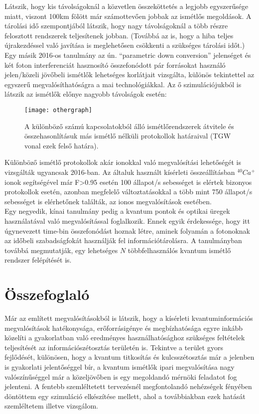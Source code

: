Látszik, hogy kis távolságoknál a közvetlen összeköttetés a legjobb egyszerűsége miatt, viszont 100km fölött már számottevően jobbak az ismétlős megoldások. A tárolási idő szempontjából látszik, hogy nagy távolságoknál a több részre felosztott rendszerek teljesítenek jobban. (Továbbá az is, hogy a hiba teljes újrakezdéssel való javítása is meglehetősen csökkenti a szükséges tárolási időt.)\\
Egy másik 2016-os tanulmány \cite{krovi2016practical} az ún. ``parametric down conversion'' jelenséget és két foton interferenciát hasznosító  összefonódott pár forrásokat használó jelen/közeli jövőbeli ismétlők lehetséges korlátjait vizsgálta, különös tekintettel az egyszerű megvalósíthatóságra a mai technológiákkal. Az ő szimulációjukból is látszik az ismétlők előnye nagyobb távolságok esetén:\\
\begin{figure}[H]
\centering
\texttt{[image: othergraph]}
\caption[Ismétlő teljesítményhatár]{A különböző számú kapcsolatokból álló ismétlőrendszerek átvitele és összehasonlításuk más ismétlő nélküli protokollok határaival (TGW vonal ezek felső határa).
}
\end{figure}
Különböző ismétlő protokollok akár ionokkal való megvalósítási lehetőségét is vizsgálták \cite{pfister2016quantum} ugyancsak 2016-ban. Az általuk használt kísérleti összeállításban $^{40}Ca^+$ ionok segítségével már F>0.95 esetén 100 állapot/s sebességet is elértek bizonyos protokollok esetén, azonban megfelelő változtatásokkal a több mint 750 állapot/s sebességet is elérhetőnek találták, az ionos megvalósítások esetében.\\

Egy negyedik, kínai tanulmány \cite{li2016heralded} pedig a kvantum pontok és optikai üregek használatával való megvalósítással foglalkozik. Ennek egyik érdekessége, hogy itt úgynevezett time-bin összefonódást hoznak létre, aminek folyamán a fotonoknak az időbeli szabadságfokát használják fel információtárolásra. 
A tanulmányban továbbá megmutatják, egy lehetséges $N$ többfelhasználós kvantum ismétlő rendszer felépítését is.

\section{Összefoglaló}

Már az említett megvalósításokból is látszik, hogy a kísérleti kvantuminformációs megvalósítások hatékonysága, erőforrásigénye és megbízhatósága egyre inkább közelíti a gyakorlatban való eredményes használhatósághoz szükséges feltételek teljesítését az információszétosztás területén is. Tekintve a terület gyors fejlődését, különösen, hogy a kvantum titkosítás és kulcsszétosztás már a jelenben is gyakorlati jelentőséggel bír, a kvantum ismétlők ipari megvalósítása nagy valószínűséggel már a közeljövőben is egy megoldandó mérnöki feladatot fog jelenteni. A fentebb szemléltetett tervezésnél megfontolandó nehézségek fényében döntöttem egy szimuláció elkészítése mellett, ahol a továbbiakban ezek hatását szemléltetem illetve vizsgálom.
